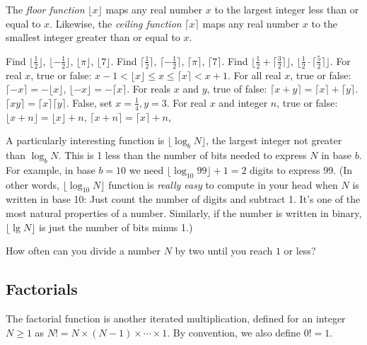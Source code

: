 \documentclass[a4paper,nobib]{tufte-handout}
\begin{document}
The \emph{floor function} $\lfloor x\rfloor$ maps any real number $x$
to the largest integer less than or equal to $x$. Likewise, the
\emph{ceiling function} $\lceil x\rceil$ maps any real number $x$ to
the smallest integer greater than or equal to $x$.

\begin{ExerciseList}
\Exercise Find $\lfloor \frac{1}{2}\rfloor$, $\lfloor
  -\frac{1}{2}\rfloor$,  $\lfloor \pi\rfloor$, $\lfloor 7\rfloor$.
\Exercise Find $\lceil \frac{1}{2}\rceil$, $\lceil
  -\frac{1}{2}\rceil$,  $\lceil \pi\rceil$, $\lceil 7\rceil$.
\Exercise Find
 $\lfloor \frac{1}{2}+\lceil \frac{3}{2}\rceil \rfloor$, 
 $\lfloor \frac{1}{2}\cdot \lceil \frac{5}{2}\rceil \rfloor$.
\Exercise For real $x$, true or false: $x-1<\lfloor x \rfloor \leq x \leq
  \lceil x\rceil < x+1$.
\Exercise For all real $x$, true or false: $\lceil -x\rceil = -\lfloor x\rfloor$,
  $\lfloor -x\rfloor = -\lceil x\rceil$.
\Exercise For reals $x$ and $y$, true of false: $\lceil x+y\rceil = \lceil
  x\rceil + \lceil y\rceil$. $\lceil xy\rceil =\lceil x\rceil \lceil
  y\rceil.$
  \Answer False, set $x=\frac{1}{4}, y=3$.
\Exercise For real $x$ and integer $n$, true or false:
  $\lfloor x+n\rfloor = \lfloor x\rfloor+n$,
  $\lceil x+n\rceil = \lceil x\rceil+n$,
\end{ExerciseList}

A particularly interesting function is $\lfloor \log_b N\rfloor$, the
largest integer not greater than $\log_b N$.  This is 1 less than the
number of bits needed to express $N$ in base $b$. For example, in base
$b=10$ we need $\lfloor \log_{10} 99\rfloor +1= 2$ digits to express
$99$. (In other words, $\lfloor \log_{10} N\rfloor$ function is
\emph{really easy} to compute in your head when $N$ is written in base 10: Just count the number of
digits and subtract 1. It's one of the most natural properties of a
number. Similarly, if the number is written in binary, $\lfloor \lg N\rfloor$ is
just the number of bits minus 1.)

\begin{ExerciseList}
\Exercise How often can you divide a number $N$ by two until you reach $1$
  or less?
\end{ExerciseList}

\subsection{Factorials}

The factorial function is another iterated multiplication, defined for an
integer $N\geq 1$ as $N!= N\times (N-1)\times \cdots \times 1$. By
convention, we also define $0!=1$.
\end{document}
